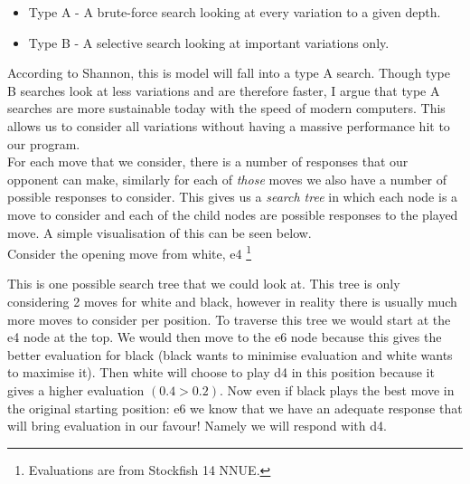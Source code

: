 \begin{itemize}
  \item{Type A - A brute-force search looking at every variation
        to a given depth.}
  \item{Type B - A selective search looking at important variations 
        only.}
\end{itemize}

According to Shannon, this is model will fall into a
type A search. Though type B searches look at less variations and 
are therefore faster, I argue that type A searches are more sustainable 
today with the speed of modern computers. This allows us to consider all 
variations without having a massive performance hit to our program.\\

For each move that we consider, there is a number of 
responses that our opponent can make, similarly for each of 
\textit{those} moves we also have a number of possible 
responses to consider. This gives us a \textit{search tree}
in which each node is a move to consider and each of the 
child nodes are possible responses to the played move. A 
simple visualisation of this can be seen below.\\

Consider the opening move from white, e4
\footnote{Evaluations are from Stockfish 14 NNUE.}

\begin{center}
\end{center}

This is one possible search tree that we could look at. This
tree is only considering 2 moves for white and black, 
however in reality there is usually much more moves to 
consider per position. To traverse this tree we would start
at the e4 node at the top. We would then move to the e6 node
because this gives the better evaluation for black (black 
wants to minimise evaluation and white wants to maximise it).
Then white will choose to play d4 in this position because
it gives a higher evaluation $(0.4>0.2)$. Now even if black 
plays the best move in the original starting position: e6 
we know that we have an adequate response that will bring 
evaluation in our favour! Namely we will respond with d4.

